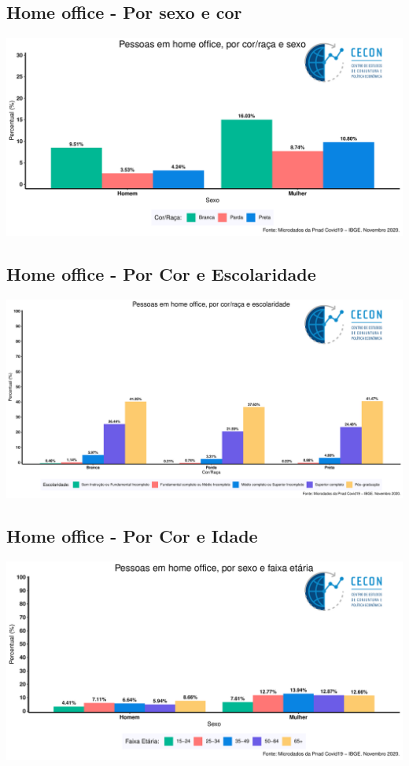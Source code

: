 \documentclass{SelfArx}
\begin{document}
\subsection*{Home office - Por sexo e cor}
\label{sec:orgcb6f966}




\begin{center}
\includegraphics[width=.9\linewidth]{./figs/PNAD_COVID/home_sexo_cor.pdf}
\end{center}

\subsection*{Home office - Por Cor e Escolaridade}
\label{sec:orgaaf3457}
\begin{center}
\includegraphics[width=.9\linewidth]{./figs/PNAD_COVID/home_edu_cor.pdf}
\end{center}
\subsection*{Home office - Por Cor e Idade}
\label{sec:org28ef649}
\begin{center}
\includegraphics[width=.9\linewidth]{./figs/PNAD_COVID/home_sexo_idade.pdf}
\end{center}
\end{document}
